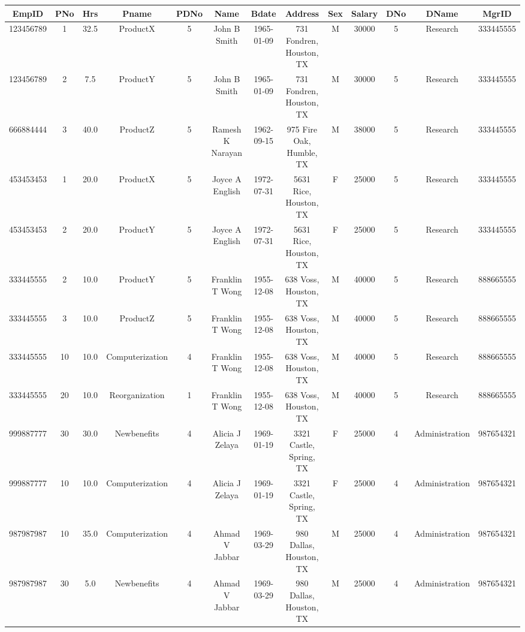 \documentclass[a4paper,11pt]{article}
\begin{document}
\begin{enumerate}
\begin{table}[H]
\hspace*{-0.7cm}\begin{tabular}{|c|c|c|c|c|c|c|c|c|c|c|c|c|}
\hline
\rowcolor{lightgray}
EmpID & PNo & Hrs & Pname & PDNo & Name & Bdate & Address & Sex & Salary & DNo & DName & MgrID\\
\hline
123456789 &  1 & 32.5 & ProductX & 5 & John B Smith & 1965-01-09 & 731 Fondren, Houston, TX & M & 30000 & 5 & Research & 333445555\\
\hline
123456789 &  2 &  7.5 & ProductY & 5 & John B Smith & 1965-01-09 & 731 Fondren, Houston, TX & M & 30000 & 5 & Research & 333445555\\
\hline
666884444 &  3 & 40.0 & ProductZ & 5 & Ramesh K Narayan & 1962-09-15 & 975 Fire Oak, Humble, TX & M & 38000 & 5 & Research & 333445555\\
\hline
453453453 &  1 & 20.0 & ProductX & 5 & Joyce A English & 1972-07-31 & 5631 Rice, Houston, TX & F & 25000 & 5 & Research & 333445555 \\
\hline
453453453 &  2 & 20.0 & ProductY & 5 & Joyce A English & 1972-07-31 & 5631 Rice, Houston, TX & F & 25000 & 5 & Research & 333445555 \\
\hline
333445555 &  2 & 10.0 & ProductY & 5 & Franklin T Wong & 1955-12-08 & 638 Voss, Houston, TX & M & 40000 & 5 & Research & 888665555\\
\hline
333445555 &  3 & 10.0 & ProductZ & 5 & Franklin T Wong & 1955-12-08 & 638 Voss, Houston, TX & M & 40000 & 5 & Research & 888665555\\
\hline
333445555 & 10 & 10.0 & Computerization & 4 & Franklin T Wong & 1955-12-08 & 638 Voss, Houston, TX & M & 40000 & 5 & Research & 888665555\\
\hline
333445555 & 20 & 10.0 & Reorganization & 1 & Franklin T Wong & 1955-12-08 & 638 Voss, Houston, TX & M & 40000 & 5 & Research & 888665555\\
\hline
999887777 & 30 & 30.0 & Newbenefits & 4 & Alicia J Zelaya & 1969-01-19 & 3321 Castle, Spring, TX & F & 25000 & 4 & Administration & 987654321\\
\hline
999887777 & 10 & 10.0 & Computerization & 4 & Alicia J Zelaya & 1969-01-19 & 3321 Castle, Spring, TX & F & 25000 & 4 & Administration & 987654321\\
\hline
987987987 & 10 & 35.0 & Computerization & 4 & Ahmad V Jabbar & 1969-03-29 & 980 Dallas, Houston, TX & M & 25000 & 4 & Administration & 987654321\\
\hline
987987987 & 30 &  5.0 & Newbenefits & 4 & Ahmad V Jabbar & 1969-03-29 & 980 Dallas, Houston, TX & M & 25000 & 4 & Administration & 987654321\\

\end{tabular}
\end{table}
\end{enumerate}
\end{document}
